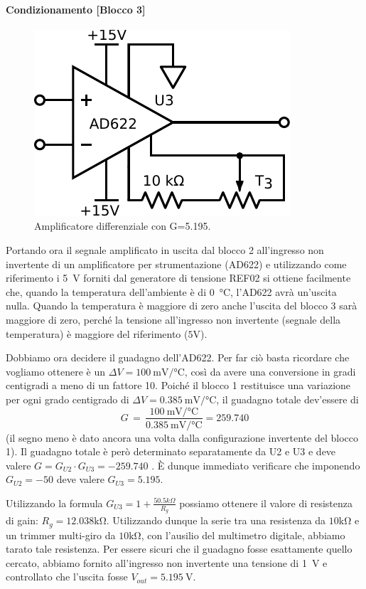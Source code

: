 \paragraph{Condizionamento [Blocco 3]\newline}

\begin{figure}
\centering
\includegraphics[width=.27\textwidth]{../E06/latex/P3.pdf}
\caption{Amplificatore differenziale con G=5.195.}
\label{cir6:blocco3}
\end{figure}

Portando ora il segnale amplificato in uscita dal blocco 2 all'ingresso non invertente di un amplificatore per strumentazione (AD622) e utilizzando come riferimento i \SI{5}{\volt} forniti dal generatore di tensione REF02 si ottiene facilmente che, quando la temperatura dell'ambiente è di \SI{0}{\celsius}, l'AD622 avrà un'uscita nulla.
Quando la temperatura è maggiore di zero anche l'uscita del blocco 3 sarà maggiore di zero, perché la tensione all'ingresso non invertente (segnale della temperatura) è maggiore del riferimento ($5\si{\volt}$).

Dobbiamo ora decidere il guadagno dell'AD622.
Per far ciò basta ricordare che vogliamo ottenere è un $\Delta V=\SI{100}{\milli\volt}/\si{\celsius}$, così da avere una conversione in gradi centigradi a meno di un fattore 10.
Poiché il blocco 1 restituisce una variazione per ogni grado centigrado di $\Delta V=\SI{0.385}{\milli\volt}/\si{\celsius}$, il guadagno totale dev'essere di
$$G\,=\,\frac{\SI{100}{\milli\volt}/\si{\celsius}}{\SI{0.385}{\milli\volt}/\si{\celsius}}=\num{259.740}$$
(il segno meno è dato ancora una volta dalla configurazione invertente del blocco 1).
Il guadagno totale è però determinato separatamente da U2 e U3 e deve valere $G= G_{U2}\cdot G_{U3}=-259.740$ .
È dunque immediato verificare che imponendo $G_{U2}=-50$ deve valere $G_{U3}=5.195$.

Utilizzando la formula $G_{U3}=1+\frac{50.5k\Omega}{R_g}$ possiamo ottenere il valore di resistenza di gain: $R_g=12.038\si{\kilo\ohm}$.
Utilizzando dunque la serie tra una resistenza da $10\si{\kilo\ohm}$ e un trimmer multi-giro da $10\si{\kilo\ohm}$, con l'ausilio del multimetro digitale, abbiamo tarato tale resistenza. 
Per essere sicuri che il guadagno fosse esattamente quello cercato, abbiamo fornito all'ingresso non invertente una tensione di \SI{1}{\volt} e controllato che l'uscita fosse $V_{out}=\SI{5.195}{\V}$. 

